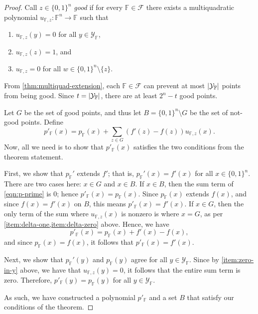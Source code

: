 \documentclass[english,12pt]{reedthesis}
\theoremstyle{plain}
\theoremstyle{definition}
\theoremstyle{remark}
\DeclarePairedDelimiter{\abs}{\lvert}{\rvert}
\begin{document}
\begin{proof}
  Call $z \in \{0, 1\}^{n}$ \emph{good} if for every $\mathbb{F} \in \mathcal{F}$ there exists
  a multiquadratic polynomial
  $u_{\mathbb{F},z}\colon \mathbb{F}^{n} \rightarrow \mathbb{F}$ such that
  \begin{enumerate}[label=(\alph*)]
    \item\label{item:zero-in-y} $u_{\mathbb{F},z}(y) = 0$ for all
          $y \in \mathcal{Y}_{\mathbb{F}}$,
    \item\label{item:delta-one} $u_{\mathbb{F},z}(z) = 1$, and
    \item\label{item:delta-zero} $u_{\mathbb{F},z} = 0$ for all
          $w \in \{0, 1\}^{n} \setminus \{z\}$.
  \end{enumerate}
  From \cref{thm:multiquad-extension}, each $\mathbb{F} \in \mathcal{F}$ can prevent at most
  $\abs{\mathcal{Y}_{\mathbb{F}}}$ points from being good. Since
  $t = \abs{\mathcal{Y}_{\mathbb{F}}}$, there are at least $2^{n} - t$ good points.

  Let $G$ be the set of good points, and thus let $B = \{0, 1\}^{n} \setminus G$ be the
  set of not-good points. Define
  \begin{equation}\label{eqn:p-prime}
    p'_{\mathbb{F}}(x) = p_{\mathbb{F}}(x) + \sum_{z \in G}(f'(z) - f(z))u_{\mathbb{F},z}(x).
  \end{equation}
  Now, all we need is to show that $p'_{\mathbb{F}}(x)$ satisfies the two
  conditions from the theorem statement.

  First, we show that $p_{\mathbb{F}}'$ extends $f'$; that is,
  $p_{\mathbb{F}}'(x) = f'(x)$ for all $x \in \{0, 1\}^{n}$. There are two cases
  here: $x \in G$ and $x \in B$. If $x \in B$, then the sum term of \cref{eqn:p-prime}
  is $0$; hence $p'_{\mathbb{F}}(x) = p_{\mathbb{F}}(x)$. Since
  $p_{\mathbb{F}}(x)$ extends $f(x)$, and since $f(x) = f'(x)$ on $B$, this
  means $p'_{\mathbb{F}}(x) = f'(x)$. If $x \in G$, then the only term of the sum
  where $u_{\mathbb{F},z}(x)$ is nonzero is where $x = G$, as per
  \cref{item:delta-one,item:delta-zero} above. Hence, we have
  \[
    p'_{\mathbb{F}}(x) = p_{\mathbb{F}}(x) + f'(x) - f(x),
  \]
  and since $p_{\mathbb{F}}(x) = f(x)$, it follows that
  $p'_{\mathbb{F}}(x) = f'(x)$.

  Next, we show that $p_{\mathbb{F}}'(y)$ and $p_{\mathbb{F}}(y)$ agree for all
  $y \in \mathcal{Y}_{\mathbb{F}}$. Since by \cref{item:zero-in-y} above, we have that
  $u_{\mathbb{F},z}(y) = 0$, it follows that the entire sum term is zero.
  Therefore, $p'_{\mathbb{F}}(y) = p_{\mathbb{F}}(y)$ for all
  $y \in \mathcal{Y}_{\mathbb{F}}$.

  As such, we have constructed a polynomial $p'_{\mathbb{F}}$ and a set $B$ that
  satisfy our conditions of the theorem.
\end{proof}
\end{document}
